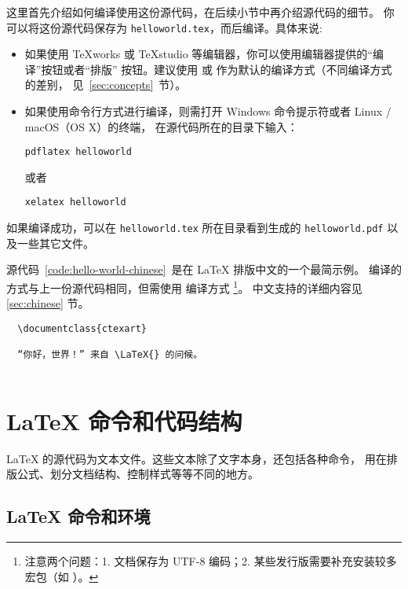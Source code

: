 这里首先介绍如何编译使用这份源代码，在后续小节中再介绍源代码的细节。
你可以将这份源代码保存为 \texttt{helloworld.tex}，而后编译。具体来说:
\begin{itemize}
  \item 如果使用 TeXworks 或 TeXstudio 等编辑器，你可以使用编辑器提供的“编译”按钮或者“排版”
  按钮。建议使用  或  作为默认的编译方式（不同编译方式的差别，
  见~\ref{sec:concepts}~节）。
  \item 如果使用命令行方式进行编译，则需打开 Windows 命令提示符或者 Linux / macOS（OS X）的终端，
  在源代码所在的目录下输入：
\begin{verbatim}
pdflatex helloworld
\end{verbatim}
或者
\begin{verbatim}
xelatex helloworld
\end{verbatim}
\end{itemize}

如果编译成功，可以在 \texttt{helloworld.tex} 所在目录看到生成的 \texttt{helloworld.pdf} 以及一些其它文件。

源代码~\ref{code:hello-world-chinese}~是在 \LaTeX{} 排版中文的一个最简示例。
编译的方式与上一份源代码相同，但需使用  编译方式%
\footnote{注意两个问题：1. 文档保存为 UTF-8 编码；2. 某些发行版需要补充安装较多宏包（如 ）。}。
中文支持的详细内容见 \ref{sec:chinese} 节。

\begin{sourcecode}[htp]
  \begin{Verbatim}
  \documentclass{ctexart}
  
  “你好，世界！” 来自 \LaTeX{} 的问候。
  
  \end{Verbatim}
  \caption{在\LaTeX{} 中排版中文的最简源代码示例。}\label{code:hello-world-chinese}
\end{sourcecode}

\section{\LaTeX{} 命令和代码结构}\label{sec:src}

\LaTeX{} 的源代码为文本文件。这些文本除了文字本身，还包括各种命令，
用在排版公式、划分文档结构、控制样式等等不同的地方。

\subsection{\LaTeX{} 命令和环境}\label{subsec:cmds}

